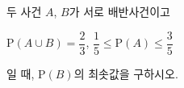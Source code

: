 두 사건 $A$, $B$가 서로 배반사건이고\par\smallskip\noindent\hspace*{1.5em}$\mathrm{P}(A\cup B)=\dfrac{2}{3}$, $\dfrac{1}{5}\le\mathrm{P}(A)\le\dfrac{3}{5}$\par\smallskip\noindent 일 때, $\mathrm{P}(B)$의 최솟값을 구하시오.
